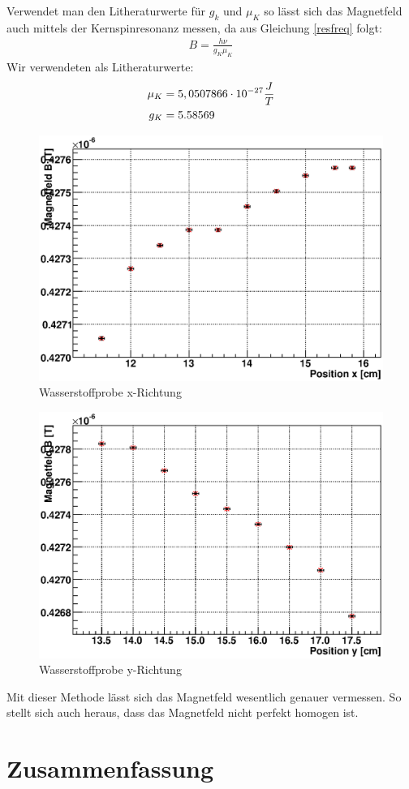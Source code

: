 \documentclass[12pt]{article}
\begin{document}
Verwendet man den Litheraturwerte für $g_k$ und $\mu_K$ so lässt sich das Magnetfeld auch mittels der Kernspinresonanz messen, da aus Gleichung \ref{resfreq} folgt:
\begin{align}
 B = \frac{h \nu}{g_K \mu_K}
\end{align}
Wir verwendeten als Litheraturwerte:
\begin{align}
 \notag \mu_K &= 5,0507866\cdot 10^{-27} \frac{J}{T} \\
 \notag g_K &= 5.58569
\end{align}


\begin{figure}[H]
\centering
\includegraphics[width=0.9\linewidth]{pictures/wasser_x.eps}
\caption{Wasserstoffprobe x-Richtung}
\end{figure}

\begin{figure}[H]
\centering
\includegraphics[width=0.9\linewidth]{pictures/wasser_y.eps}
\caption{Wasserstoffprobe y-Richtung}
\end{figure}

Mit dieser Methode lässt sich das Magnetfeld wesentlich genauer vermessen. So stellt sich auch heraus, dass das Magnetfeld nicht perfekt homogen ist.

\section{Zusammenfassung}
\end{document}
